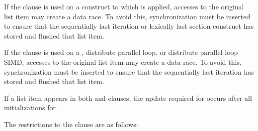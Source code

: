 If the  clause is used on a construct to which  is applied, 
accesses to the original list item may create a data race. To avoid this, synchronization 
must be inserted to ensure that the sequentially last iteration or lexically last section 
construct has stored and flushed that list item.

If the  clause is used on a , distribute parallel loop, or distribute parallel loop SIMD, accesses to the original list item may create a data race. To avoid this, synchronization must be inserted to ensure that the sequentially last iteration has stored and flushed that list item.

If a list item appears in both  and  clauses, the update 
required for  occurs after all initializations for .

\restrictions
The restrictions to the  clause are as follows:

